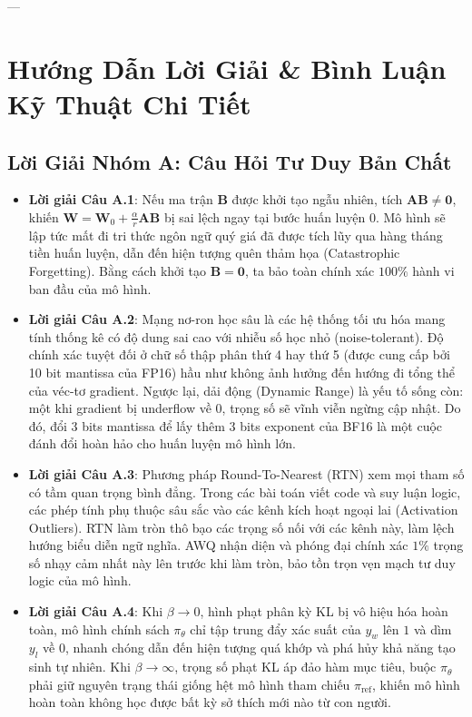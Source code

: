 ---

\section{Hướng Dẫn Lời Giải \& Bình Luận Kỹ Thuật Chi Tiết}
\label{sec:ch11-solutions}

\subsection{Lời Giải Nhóm A: Câu Hỏi Tư Duy Bản Chất}
\begin{itemize}
  \item \textbf{Lời giải Câu A.1}:
  Nếu ma trận $\mathbf{B}$ được khởi tạo ngẫu nhiên, tích $\mathbf{A}\mathbf{B} \neq \mathbf{0}$, khiến $\mathbf{W} = \mathbf{W}_0 + \frac{\alpha}{r}\mathbf{A}\mathbf{B}$ bị sai lệch ngay tại bước huấn luyện $0$. Mô hình sẽ lập tức mất đi tri thức ngôn ngữ quý giá đã được tích lũy qua hàng tháng tiền huấn luyện, dẫn đến hiện tượng quên thảm họa (Catastrophic Forgetting). Bằng cách khởi tạo $\mathbf{B} = \mathbf{0}$, ta bảo toàn chính xác $100\%$ hành vi ban đầu của mô hình.

  \item \textbf{Lời giải Câu A.2}:
  Mạng nơ-ron học sâu là các hệ thống tối ưu hóa mang tính thống kê có độ dung sai cao với nhiễu số học nhỏ (noise-tolerant). Độ chính xác tuyệt đối ở chữ số thập phân thứ 4 hay thứ 5 (được cung cấp bởi 10 bit mantissa của FP16) hầu như không ảnh hưởng đến hướng đi tổng thể của véc-tơ gradient. Ngược lại, dải động (Dynamic Range) là yếu tố sống còn: một khi gradient bị underflow về 0, trọng số sẽ vĩnh viễn ngừng cập nhật. Do đó, đổi 3 bits mantissa để lấy thêm 3 bits exponent của BF16 là một cuộc đánh đổi hoàn hảo cho huấn luyện mô hình lớn.

  \item \textbf{Lời giải Câu A.3}:
  Phương pháp Round-To-Nearest (RTN) xem mọi tham số có tầm quan trọng bình đẳng. Trong các bài toán viết code và suy luận logic, các phép tính phụ thuộc sâu sắc vào các kênh kích hoạt ngoại lai (Activation Outliers). RTN làm tròn thô bạo các trọng số nối với các kênh này, làm lệch hướng biểu diễn ngữ nghĩa. AWQ nhận diện và phóng đại chính xác $1\%$ trọng số nhạy cảm nhất này lên trước khi làm tròn, bảo tồn trọn vẹn mạch tư duy logic của mô hình.

  \item \textbf{Lời giải Câu A.4}:
  Khi $\beta \to 0$, hình phạt phân kỳ KL bị vô hiệu hóa hoàn toàn, mô hình chính sách $\pi_\theta$ chỉ tập trung đẩy xác suất của $y_w$ lên $1$ và dìm $y_l$ về $0$, nhanh chóng dẫn đến hiện tượng quá khớp và phá hủy khả năng tạo sinh tự nhiên. Khi $\beta \to \infty$, trọng số phạt KL áp đảo hàm mục tiêu, buộc $\pi_\theta$ phải giữ nguyên trạng thái giống hệt mô hình tham chiếu $\pi_{\text{ref}}$, khiến mô hình hoàn toàn không học được bất kỳ sở thích mới nào từ con người.


\end{itemize}
